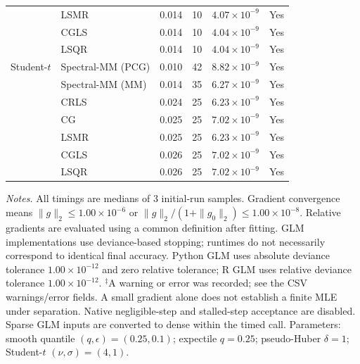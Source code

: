 \begin{longtable}{llrrrc}
 & LSMR & 0.014 & 10 & $4.07\times10^{-9}$ & Yes \\
 & CGLS & 0.014 & 10 & $4.04\times10^{-9}$ & Yes \\
 & LSQR & 0.014 & 10 & $4.04\times10^{-9}$ & Yes \\
\midrule
Student-$t$ & Spectral-MM (PCG) & 0.010 & 42 & $8.82\times10^{-9}$ & Yes \\
 & Spectral-MM (MM) & 0.014 & 35 & $6.27\times10^{-9}$ & Yes \\
 & CRLS & 0.024 & 25 & $6.23\times10^{-9}$ & Yes \\
 & CG & 0.025 & 25 & $7.02\times10^{-9}$ & Yes \\
 & LSMR & 0.025 & 25 & $6.23\times10^{-9}$ & Yes \\
 & CGLS & 0.026 & 25 & $7.02\times10^{-9}$ & Yes \\
 & LSQR & 0.026 & 25 & $7.02\times10^{-9}$ & Yes \\
\end{longtable}
\noindent\textit{Notes.} All timings are medians of 3 initial-run samples.
Gradient convergence means $\|g\|_2\leq 1.00\times10^{-6}$ or $\|g\|_2/(1+\|g_0\|_2)\leq 1.00\times10^{-8}$.
Relative gradients are evaluated using a common definition after fitting. GLM implementations use deviance-based stopping; runtimes do not necessarily correspond to identical final accuracy.
Python GLM uses absolute deviance tolerance $1.00\times10^{-12}$ and zero relative tolerance; R GLM uses relative deviance tolerance $1.00\times10^{-12}$.
$^{\ddagger}$A warning or error was recorded; see the CSV warnings/error fields. A small gradient alone does not establish a finite MLE under separation.
Native negligible-step and stalled-step acceptance are disabled.
Sparse GLM inputs are converted to dense within the timed call.
Parameters: smooth quantile $(q,\epsilon)=(0.25,0.1)$; expectile $q=0.25$; pseudo-Huber $\delta=1$; Student-$t$ $(\nu,\sigma)=(4,1)$.
\par
\endgroup
